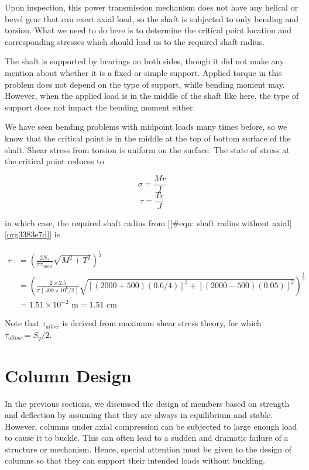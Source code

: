 \documentclass[a4paper,openany,12pt]{book}
\begin{document}
{{Upon inspection, this power transmission mechanism does not have any
helical or bevel gear that can exert axial load, so the shaft is
subjected to only bending and torsion. What we need to do here is to
determine the critical point location and corresponding stresses which
should lead us to the required shaft radius.

The shaft is supported by bearings on both sides, though it did not make
any mention about whether it is a fixed or simple support. Applied
torque in this problem does not depend on the type of support, while
bending moment may. However, when the applied load is in the middle of
the shaft like here, the type of support does not impact the bending
moment either.

We have seen bending problems with midpoint loads many times before, so
we know that the critical point is in the middle at the top of bottom
surface of the shaft. Shear stress from torsion is uniform on the
surface. The state of stress at the critical point reduces to

$$\sigma = \frac{Mr}{I}$$ $$\tau = \frac{Tr}{J}$$

in which case, the required shaft radius from
[[\#eqn: shaft radius without axial]\ref{org3383e7d}]
is

$$\begin{aligned}
    r &= \left( \frac{2 N_s}{\pi \tau _{allow}}\sqrt {M^2 +T^2}  \right)^{\frac{1}{3}} \\
      &= \left( \frac{2 \times 2.5}{\pi (400 \times 10^6 /2 )}\sqrt {[(2000+500)(0.6/4)]^2 +[(2000-500)(0.05)]^2}  \right)^{\frac{1}{3}} \\
      &= 1.51 \times 10^{-2} \text{ m} = 1.51 \text{ cm}
  \end{aligned}$$

Note that \(\tau_{allow}\) is derived from maximum shear stress theory,
for which \(\tau_{allow} = S_y/2\).

\section{Column Design}
\label{sec:org5bedcdd}
In the previous sections, we discussed the design of members based on
strength and deflection by assuming that they are always in equilibrium
and stable. However, columns under axial compression can be subjected to
large enough load to cause it to buckle. This can often lead to a sudden
and dramatic failure of a structure or mechanism. Hence, special
attention must be given to the design of columns so that they can
support their intended loads without buckling.

}}
\end{document}
